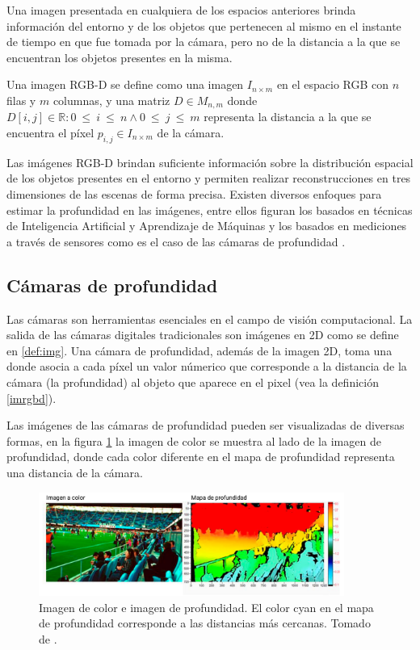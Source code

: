 Una imagen presentada en cualquiera de los espacios anteriores brinda información del entorno y de los objetos que pertenecen al mismo en el instante de tiempo en que fue tomada por la cámara, pero no de la distancia a la que se encuentran los objetos presentes en la misma. 

\begin{definition}\label{imrgbd}
	Una imagen RGB-D se define como una imagen $I_{n \times m}$ en el espacio RGB con $n$ filas y $m$ columnas, y una matriz $D \in M_{n, m}$ donde $D[i, j] \in \mathbb{R}: 0~\leq~i~\leq~n \wedge 0~\leq~j~\leq~m$ representa la distancia a la que se encuentra el píxel $p_{i,j} \in I_{n \times m}$ de la cámara.
\end{definition}

Las imágenes RGB-D brindan suficiente información sobre la distribución espacial de los objetos presentes en el entorno y permiten realizar reconstrucciones en tres dimensiones de las escenas de forma precisa. Existen diversos enfoques para estimar la profundidad en las imágenes, entre ellos figuran los basados en técnicas de Inteligencia Artificial y Aprendizaje de Máquinas \cite{fu2018deep, hu2019revisiting} y los basados en mediciones a través de sensores como es el caso de las cámaras de profundidad \cite{intel}.

\subsection{Cámaras de profundidad}

Las cámaras son herramientas esenciales en el campo de visión computacional. La salida de las cámaras digitales tradicionales son imágenes en 2D como se define en \ref{def:img}. Una cámara de profundidad, además de la imagen 2D, toma una donde asocia a cada píxel un valor númerico que corresponde a la distancia de la cámara (la profundidad) al objeto que aparece en el pixel (vea la definición \ref{imrgbd}).

Las imágenes de las cámaras de profundidad pueden ser visualizadas de diversas formas, en la figura \ref{fig:rgbd} la imagen de color se muestra al lado de la imagen de profundidad, donde cada color diferente en el mapa de profundidad representa una distancia de la cámara.

\begin{figure}[ht]
	\centering
	\includegraphics[width=10cm]{./Graphics/rgbd.png}
	\caption{Imagen de color e imagen de profundidad. El color cyan en el mapa de profundidad corresponde a las distancias más cercanas. Tomado de \cite{intel}.}
	\label{fig:rgbd}
\end{figure}

